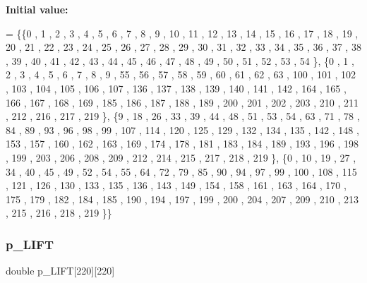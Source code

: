 {\bfseries Initial value\+:}
\begin{DoxyCode}
= \{\{0 , 1 , 2 , 3 , 4 , 5 , 6 , 7 , 8 , 9 , 10 , 11 , 12 , 13 , 14 , 15 , 16 , 17 , 18 , 19 , 20 , 21 , 22 
      , 23 , 24 , 25 , 26 , 27 , 28 , 29 , 30 , 31 , 32 , 33 , 34 , 35 , 36 , 37 , 38 , 39 , 40 , 41 , 42 , 43 , 
      44 , 45 , 46 , 47 , 48 , 49 , 50 , 51 , 52 , 53 , 54 \},
\{0 , 1 , 2 , 3 , 4 , 5 , 6 , 7 , 8 , 9 , 55 , 56 , 57 , 58 , 59 , 60 , 61 , 62 , 63 , 100 , 101 , 102 , 103
       , 104 , 105 , 106 , 107 , 136 , 137 , 138 , 139 , 140 , 141 , 142 , 164 , 165 , 166 , 167 , 168 , 169 , 185
       , 186 , 187 , 188 , 189 , 200 , 201 , 202 , 203 , 210 , 211 , 212 , 216 , 217 , 219 \},
\{9 , 18 , 26 , 33 , 39 , 44 , 48 , 51 , 53 , 54 , 63 , 71 , 78 , 84 , 89 , 93 , 96 , 98 , 99 , 107 , 114 , 
      120 , 125 , 129 , 132 , 134 , 135 , 142 , 148 , 153 , 157 , 160 , 162 , 163 , 169 , 174 , 178 , 181 , 183 , 
      184 , 189 , 193 , 196 , 198 , 199 , 203 , 206 , 208 , 209 , 212 , 214 , 215 , 217 , 218 , 219 \},
\{0 , 10 , 19 , 27 , 34 , 40 , 45 , 49 , 52 , 54 , 55 , 64 , 72 , 79 , 85 , 90 , 94 , 97 , 99 , 100 , 108 , 
      115 , 121 , 126 , 130 , 133 , 135 , 136 , 143 , 149 , 154 , 158 , 161 , 163 , 164 , 170 , 175 , 179 , 182 , 
      184 , 185 , 190 , 194 , 197 , 199 , 200 , 204 , 207 , 209 , 210 , 213 , 215 , 216 , 218 , 219 \}\}
\end{DoxyCode}
\mbox{\label{a00503_a89b7c823595dd397ded387b04aeb95a6}} 
\subsubsection{\texorpdfstring{p\+\_\+\+L\+I\+FT}{p\_LIFT}}
{\footnotesize\ttfamily double p\+\_\+\+L\+I\+FT\mbox{[}220\mbox{]}\mbox{[}220\mbox{]}}

\mbox{\label{a00503_a5d056fe782667f5452e6798d41b40f07}} 
